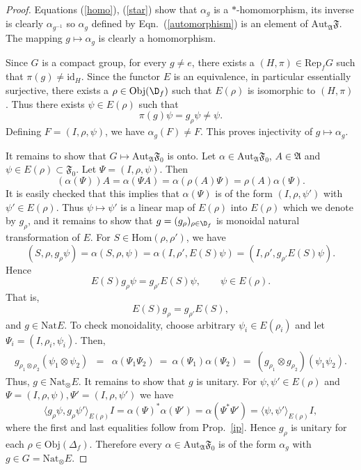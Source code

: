 \documentclass[12pt]{article}
\newcommand{\alg}[1]{\mathfrak{#1}}
\theoremstyle{definition}
\theoremstyle{definition}
\theoremstyle{remark}
\newcommand{\Obj}{\mathrm{Obj}}
\def\a{\alpha} \def\b{\beta} \def\g{\gamma} \def\d{\delta}
\newcommand{\Hom}{\mathrm{Hom}}
\newcommand{\Aut}{\mathrm{Aut}}
\newcommand{\Rep}{\mathrm{Rep}}
\def\id{\mathrm{id}}
\newcommand{\Nat}{\mathrm{Nat}}
\begin{document}
\begin{proof}
Equations (\ref{homo}), (\ref{star}) show that $\alpha _g$ is a $*$-homomorphism, its
inverse is clearly $\alpha _{g^{-1}}$ so $\alpha _g$ defined by Eqn.\
(\ref{automorphism}) is an element of $\Aut _{\alg{A}}\alg{F}$.  The mapping $g\mapsto
\alpha _g$ is clearly a homomorphism.  

Since $G$ is a compact group, for every $g\neq e$, there exists a $(H, \pi ) \in \Rep
_fG$ such that $\pi (g)\neq \id _H$.  Since the functor $E$ is an equivalence, in
particular essentially surjective, there exists a $\rho \in \Obj (\D _f)$ such that
$E(\rho )$ is isomorphic to $(H,\pi )$.  Thus there exists $\psi \in E(\rho )$ such
that $$ \pi (g)\psi =g_{\rho}\psi \neq \psi .$$ Defining $F=(I,\rho ,\psi )$, we have
$\a _g(F)\neq F$.  This proves injectivity of $g\mapsto \a _g$. 

It remains to show that $G\mapsto \Aut _{\alg{A}}\alg{F}_0$ is onto.  Let $\alpha \in
\Aut _{\alg{A}}\alg{F}_0$, $A\in \alg{A}$ and $\psi \in E(\rho )\subset \alg{F}_0$.
Let $\Psi =(I,\rho ,\psi )$.  Then
$$ (\alpha (\Psi ))A = \alpha (\Psi A) = \alpha (\rho (A)\Psi )=\rho (A)\alpha (\Psi
).$$ It is easily checked that this implies that $\alpha (\Psi )$ is of the form
$(I,\rho ,\psi ')$ with $\psi '\in E(\rho )$.  Thus $\psi \mapsto \psi '$ is a linear
map of $E(\rho )$ into $E(\rho )$ which we denote by $g_\rho $, and it remains to
show that $g=(g_\rho )_{\rho \in \D _f}$ is monoidal natural transformation of $E$.
For $S\in \Hom (\rho ,\rho ')$, we have
$$ (S,\rho ,g_\rho \psi )=\alpha (S,\rho ,\psi )=\alpha (I,\rho ',E(S)\psi )=(I,\rho' ,g_{\rho '}E(S)\psi
) .$$ Hence
$$ E(S)g_\rho \psi =g_{\rho '}E(S)\psi ,\qquad \psi \in E(\rho ).$$
That is,
$$ E(S)g_\rho =g_{\rho '}E(S),$$
and $g\in \Nat E$.  To check monoidality, choose arbitrary $\psi _i\in E(\rho _i)$
and let $\Psi _i=(I,\rho _i,\psi _i)$.  Then,
\begin{eqnarray*} g_{\rho _1\otimes \rho _2}(\psi _1\otimes \psi _2) &=& \alpha (\Psi
  _1\Psi _2)\:=\:\alpha (\Psi _1)\alpha (\Psi _2)\:=\:(g_{\rho _1}\otimes g_{\rho
    _2})(\psi _1\psi _2 ) .
\end{eqnarray*} Thus,
$g\in \Nat _{\otimes}E$.  It remains to show that $g$ is unitary.  For $\psi ,\psi '\in
E(\rho )$ and $\Psi =(I,\rho ,\psi ),\Psi '=(I,\rho ,\psi ')$ we have
$$ \big\langle g_\rho \psi ,g_\rho \psi '\big\rangle _{E(\rho )}I =\alpha (\Psi )^*\alpha (\Psi ') =\alpha (\Psi
^*\Psi ') =\bigl\langle \psi ,\psi '\bigr\rangle _{E(\rho )}I ,$$ where the first and
last equalities follow from Prop.\ \ref{ip}.  Hence $g_\rho $ is unitary for each
$\rho \in \Obj (\Delta _f)$.  Therefore every $\a \in \Aut _{\alg{A}}\alg{F}_0$ is of
the form $\a _g$ with $g\in G=\Nat _{\otimes }E$.
\end{proof}
\end{document}
